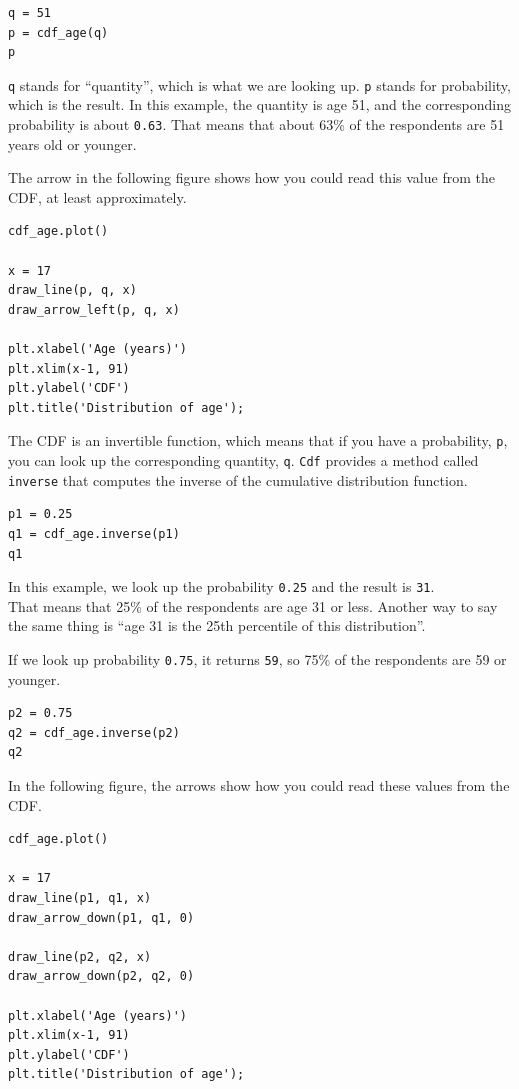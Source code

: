 \begin{lstlisting}[]
q = 51
p = cdf_age(q)
p
\end{lstlisting}

\passthrough{\lstinline!q!} stands for ``quantity'', which is what we
are looking up. \passthrough{\lstinline!p!} stands for probability,
which is the result. In this example, the quantity is age 51, and the
corresponding probability is about \passthrough{\lstinline!0.63!}. That
means that about 63\% of the respondents are 51 years old or younger.

The arrow in the following figure shows how you could read this value
from the CDF, at least approximately.

\begin{lstlisting}[]
cdf_age.plot()

x = 17
draw_line(p, q, x)
draw_arrow_left(p, q, x)

plt.xlabel('Age (years)')
plt.xlim(x-1, 91)
plt.ylabel('CDF')
plt.title('Distribution of age');
\end{lstlisting}

The CDF is an invertible function, which means that if you have a
probability, \passthrough{\lstinline!p!}, you can look up the
corresponding quantity, \passthrough{\lstinline!q!}.
\passthrough{\lstinline!Cdf!} provides a method called
\passthrough{\lstinline!inverse!} that computes the inverse of the
cumulative distribution function.

\begin{lstlisting}[]
p1 = 0.25
q1 = cdf_age.inverse(p1)
q1
\end{lstlisting}

In this example, we look up the probability
\passthrough{\lstinline!0.25!} and the result is
\passthrough{\lstinline!31!}.\\
That means that 25\% of the respondents are age 31 or less. Another way
to say the same thing is ``age 31 is the 25th percentile of this
distribution''.

If we look up probability \passthrough{\lstinline!0.75!}, it returns
\passthrough{\lstinline!59!}, so 75\% of the respondents are 59 or
younger.

\begin{lstlisting}[]
p2 = 0.75
q2 = cdf_age.inverse(p2)
q2
\end{lstlisting}

In the following figure, the arrows show how you could read these values
from the CDF.

\begin{lstlisting}[]
cdf_age.plot()

x = 17
draw_line(p1, q1, x)
draw_arrow_down(p1, q1, 0)

draw_line(p2, q2, x)
draw_arrow_down(p2, q2, 0)

plt.xlabel('Age (years)')
plt.xlim(x-1, 91)
plt.ylabel('CDF')
plt.title('Distribution of age');
\end{lstlisting}

